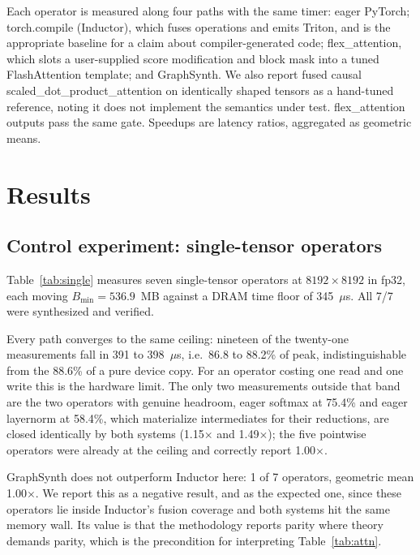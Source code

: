\documentclass[10pt,twocolumn]{article}
\newcommand{\tc}{torch.compile}
\newcommand{\fx}{flex\_attention}
\begin{document}
Each operator is measured along four paths with the same timer: eager
PyTorch; \tc{} (Inductor), which fuses operations and emits Triton, and is
the appropriate baseline for a claim about compiler-generated code; \fx{},
which slots a user-supplied score modification and block mask into a tuned
FlashAttention template; and GraphSynth. We also report fused causal
scaled\_dot\_product\_attention on identically shaped tensors as a hand-tuned
reference, noting it does not implement the semantics under test. \fx{} outputs pass
the same gate. Speedups are latency ratios, aggregated as geometric means.

\section{Results}

\subsection{Control experiment: single-tensor operators}

Table~\ref{tab:single} measures seven single-tensor operators at $8192{\times}8192$ in
fp32, each moving $B_{\min}=536.9$~MB against a DRAM time floor of 345~$\mu$s. All 7/7
were synthesized and verified.

Every path converges to the same ceiling: nineteen of the twenty-one measurements fall
in 391 to 398~$\mu$s, i.e.\ 86.8 to 88.2\% of peak, indistinguishable from the 88.6\% of a
pure device copy. For an operator costing one read and one write this is the hardware
limit. The only two measurements outside that band are the two operators with genuine
headroom, eager softmax at 75.4\% and eager layernorm at 58.4\%, which materialize intermediates for their reductions, are closed identically by
both systems (1.15$\times$ and 1.49$\times$); the five pointwise operators were already
at the ceiling and correctly report 1.00$\times$.

GraphSynth does not outperform Inductor here: 1 of 7 operators, geometric mean
1.00$\times$. We report this as a negative result, and as the expected one, since these
operators lie inside Inductor's fusion coverage and both systems hit the same memory
wall. Its value is that the methodology reports parity where theory demands parity,
which is the precondition for interpreting Table~\ref{tab:attn}.
\end{document}
